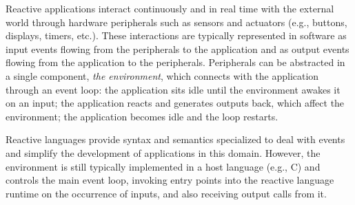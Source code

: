 \documentclass[sigplan,10pt,review,anonymous]{acmart}\settopmatter{printfolios=true,printccs=false,printacmref=false}
\begin{document}

Reactive applications interact continuously and in real time with the external
world through hardware peripherals such as sensors and actuators (e.g.,
buttons, displays, timers, etc.).
%
These interactions are typically represented in software as input events
flowing from the peripherals to the application and as output events flowing
from the application to the peripherals.
%
Peripherals can be abstracted in a
single component, \emph{the environment}, which connects with the application
through an event loop:
the application sits idle until the environment awakes it on
an input;
the application reacts and generates outputs back, which affect the environment;
the application becomes idle and the loop restarts.

Reactive languages provide syntax and semantics specialized to deal with events
and simplify the development of applications in this domain.
%
However, the environment is still typically implemented in a host language (e.g., C)
and controls the main event loop, invoking entry points into the reactive
language runtime on the occurrence of inputs, and also receiving output calls
from it.
%

\end{document}
